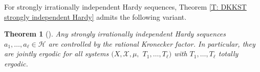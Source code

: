 \documentclass[11pt]{amsart}
\newtheorem{theorem}[lemma]{Theorem}
\theoremstyle{definition}
\newcommand{\CH}{{\mathcal H}}
\newcommand{\CX}{{\mathcal X}}
\newcommand{\1}{{\mathbf{1}}}
\begin{document}
For strongly irrationally independent Hardy sequences, Theorem \ref{T: DKKST strongly independent Hardy} admits the following variant.
\begin{theorem}%
[{\cite[Theorem 1.6]{DKKST24}}]\label{T: DKKST strongly irrationally independent Hardy}
     Any strongly irrationally independent Hardy sequences $a_1, \ldots, a_\ell\in \CH$ are controlled by the rational Kronecker factor. In particular, they are jointly ergodic for all systems $(X, \CX, \mu,$\! $T_1, \ldots, T_\ell)$ with $T_1, \ldots, T_\ell$ totally ergodic. 
 	\end{theorem}
\end{document}
